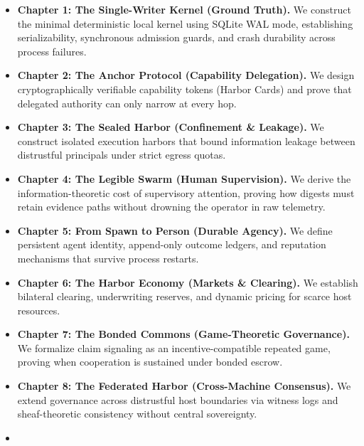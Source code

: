 \begin{itemize}[leftmargin=1.8em,itemsep=1.5pt,topsep=1.5pt,parsep=0pt]
  \item \textbf{Chapter 1: The Single-Writer Kernel (Ground Truth).} We construct the minimal deterministic local kernel using SQLite WAL mode, establishing serializability, synchronous admission guards, and crash durability across process failures.
  \item \textbf{Chapter 2: The Anchor Protocol (Capability Delegation).} We design cryptographically verifiable capability tokens (Harbor Cards) and prove that delegated authority can only narrow at every hop.
  \item \textbf{Chapter 3: The Sealed Harbor (Confinement \& Leakage).} We construct isolated execution harbors that bound information leakage between distrustful principals under strict egress quotas.
  \item \textbf{Chapter 4: The Legible Swarm (Human Supervision).} We derive the information-theoretic cost of supervisory attention, proving how digests must retain evidence paths without drowning the operator in raw telemetry.
  \item \textbf{Chapter 5: From Spawn to Person (Durable Agency).} We define persistent agent identity, append-only outcome ledgers, and reputation mechanisms that survive process restarts.
  \item \textbf{Chapter 6: The Harbor Economy (Markets \& Clearing).} We establish bilateral clearing, underwriting reserves, and dynamic pricing for scarce host resources.
  \item \textbf{Chapter 7: The Bonded Commons (Game-Theoretic Governance).} We formalize claim signaling as an incentive-compatible repeated game, proving when cooperation is sustained under bonded escrow.
  \item \textbf{Chapter 8: The Federated Harbor (Cross-Machine Consensus).} We extend governance across distrustful host boundaries via witness logs and sheaf-theoretic consistency without central sovereignty.
\end{itemize}

\begin{itemize}
\item[]
\end{itemize}

\enlargethispage{2.5\baselineskip}
\vspace{-2pt}
\pdchapterhandoffprereq

\clearpage
